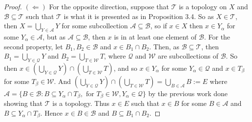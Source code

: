 \documentclass[10pt,reqno]{amsart}
\theoremstyle{definition}
\begin{document}
\begin{tcolorbox}[colback=black!5!white,colframe=black!75!black,title= Chapter 3 $\S3.2$: Exercise 3.1.]
\begin{proof}
$(\Leftarrow)$ For the opposite direction, suppose that $\mathcal T$ is a topology on $X$ and $\mathcal B \subseteq \mathcal T$ such that $\mathcal T$ is what it is presented as in Proposition 3.4. So as $X \in \mathcal T$, then $X = \bigcup_{Y \in \mathcal A} Y$ for some subcollection $\mathcal A \subseteq \mathcal B$, so if $x \in X$ then $x \in Y_\alpha$ for some $Y_\alpha \in \mathcal A$, but as $\mathcal A \subseteq \mathcal B$, then $x$ is in at least one element of $\mathcal B$. For the second property, let $B_1, B_2 \in \mathcal B$ and $x \in B_1 \cap B_2$. Then, as $\mathcal B \subseteq \mathcal T$, then $B_1 = \bigcup_{Y \in \mathcal Q} Y$ and $B_2 = \bigcup _{T \in \mathcal W} T$, where $\mathcal Q$ and $\mathcal W$ are subcollections of $\mathcal B$. So then $x \in \left ( \bigcup_{Y \in \mathcal Q} Y \right ) \cap \left( \bigcup_{T \in \mathcal W} T \right)$, and so $x \in Y_\alpha$ for some $Y_\alpha \in \mathcal Q$ and $x \in T_\beta$ for some $T_\beta \in \mathcal W$. And $\left ( \bigcup_{Y \in \mathcal Q} Y \right ) \cap \left( \bigcup_{T \in \mathcal W} T \right) = \bigcup_{B \in \mathcal A} B:= E$ where $\mathcal A = \{ B \in \mathcal B \colon B \subseteq Y_\alpha \cap T_\beta, \text{ for } T_\beta \in \mathcal W, Y_\alpha \in \mathcal Q \}$ by the previous work done showing that $\mathcal T$ is a topology. Thus $x \in E$ such that $x \in B$ for some $B \in \mathcal A$ and $B \subseteq Y_\alpha \cap T_\beta$. Hence $x \in B \in \mathcal B$ and $B \subseteq B_1 \cap B_2$.
\end{proof}
\end{tcolorbox}
\newpage 
\end{document}
